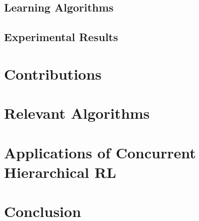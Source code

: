 \documentclass[jair,twoside,11pt,theapa]{article}
\begin{document}
\subsection{Learning Algorithms}
\label{Learning}

\subsection{Experimental Results}
\label{Experiments}

\section{Contributions}
\label{Contribs}

\section{Relevant Algorithms}
\label{relevant Algors}

\section{Applications of Concurrent Hierarchical RL}
\label{Applications}

\section{Conclusion}
\label{conclusion}

\vskip 0.2in


\end{document}
